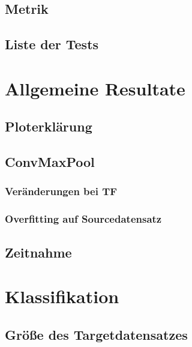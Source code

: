 \documentclass[ngerman]{report}
\begin{document}
    \section{Metrik}
    
    \section{Liste der Tests}
    

    \chapter{Allgemeine Resultate}  %
    \section{Ploterklärung}
    
    \section{ConvMaxPool}
    
    \subsection{Veränderungen bei TF}
    
    \subsection{Overfitting auf Sourcedatensatz}
    
    \section{Zeitnahme}
    

    \chapter{Klassifikation}  %
    
    \section{Größe des Targetdatensatzes}
    
\end{document}
